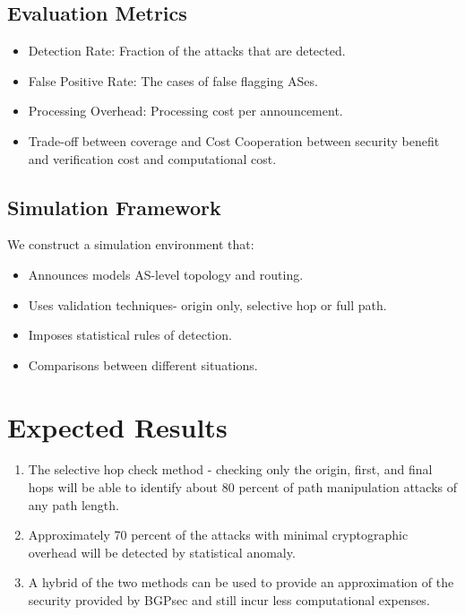 \documentclass[conference]{IEEEtran}
\begin{document}
\subsection{Evaluation Metrics}

\begin{itemize}
\item Detection Rate: Fraction of the attacks that are detected.
\item False Positive Rate: The cases of false flagging ASes.
\item Processing Overhead: Processing cost per announcement.
\item Trade-off between coverage and Cost Cooperation between security benefit and verification cost and computational cost.
\end{itemize}

\subsection{Simulation Framework}

We construct a simulation environment that:

\begin{itemize}
\item Announces models AS-level topology and routing.
\item Uses validation techniques- origin only, selective hop or full path.
\item Imposes statistical rules of detection.
\item Comparisons between different situations.
\end{itemize}

\section{Expected Results}

\begin{enumerate}
\item The selective hop check method - checking only the origin, first, and final hops will be able to identify about 80 percent of path manipulation attacks of any path length.
\item Approximately 70 percent of the attacks with minimal cryptographic overhead will be detected by statistical anomaly.
\item A hybrid of the two methods can be used to provide an approximation of the security provided by BGPsec and still incur less computational expenses.
\end{enumerate}
\end{document}
